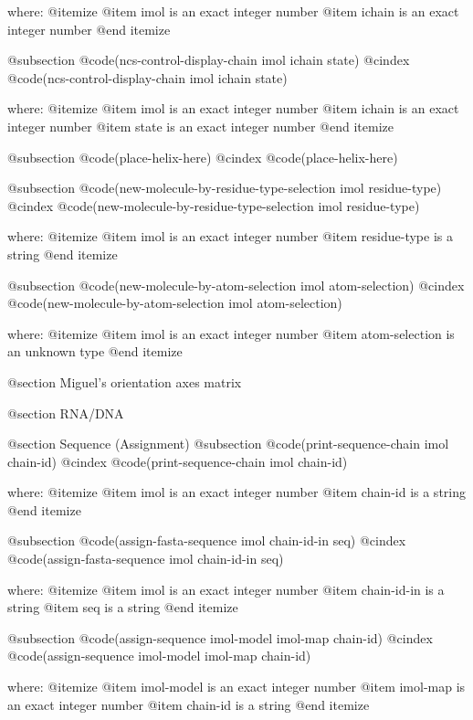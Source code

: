 where: 
 @itemize 
     @item imol is an exact integer number
     @item ichain is an exact integer number
 @end itemize


@subsection @code{(ncs-control-display-chain imol ichain state)}
@cindex @code{(ncs-control-display-chain imol ichain state)}
 
where: 
 @itemize 
     @item imol is an exact integer number
     @item ichain is an exact integer number
     @item state is an exact integer number
 @end itemize


@subsection @code{(place-helix-here)}
@cindex @code{(place-helix-here)}
 
@subsection @code{(new-molecule-by-residue-type-selection imol residue-type)}
@cindex @code{(new-molecule-by-residue-type-selection imol residue-type)}
 
where: 
 @itemize 
     @item imol is an exact integer number
     @item residue-type is a string
 @end itemize


@subsection @code{(new-molecule-by-atom-selection imol atom-selection)}
@cindex @code{(new-molecule-by-atom-selection imol atom-selection)}
 
where: 
 @itemize 
     @item imol is an exact integer number
     @item atom-selection is an unknown type
 @end itemize



@section Miguel's orientation axes matrix 

@section RNA/DNA 

@section Sequence (Assignment) 
@subsection @code{(print-sequence-chain imol chain-id)}
@cindex @code{(print-sequence-chain imol chain-id)}
 
where: 
 @itemize 
     @item imol is an exact integer number
     @item chain-id is a string
 @end itemize


@subsection @code{(assign-fasta-sequence imol chain-id-in seq)}
@cindex @code{(assign-fasta-sequence imol chain-id-in seq)}
 
where: 
 @itemize 
     @item imol is an exact integer number
     @item chain-id-in is a string
     @item seq is a string
 @end itemize


@subsection @code{(assign-sequence imol-model imol-map chain-id)}
@cindex @code{(assign-sequence imol-model imol-map chain-id)}
 
where: 
 @itemize 
     @item imol-model is an exact integer number
     @item imol-map is an exact integer number
     @item chain-id is a string
 @end itemize



